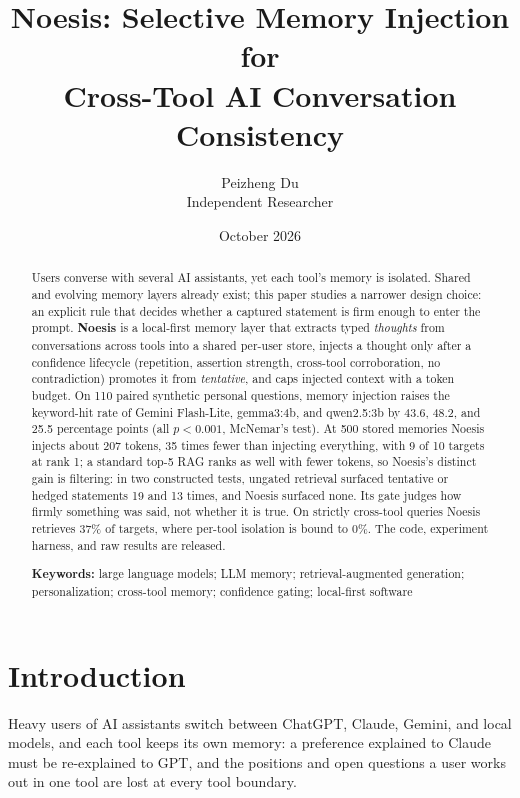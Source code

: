 \documentclass[11pt]{article}
\title{Noesis: Selective Memory Injection for\\Cross-Tool AI Conversation Consistency}
\author{Peizheng Du\\
  Independent Researcher}
\date{October 2026}
\begin{document}
\maketitle

\begin{abstract}
Users converse with several AI assistants, yet each tool's
memory is isolated. Shared and evolving memory layers already exist; this
paper studies a narrower design choice: an explicit rule that decides whether
a captured statement is firm enough to enter the prompt. \textbf{Noesis} is a
local-first memory layer that extracts typed \emph{thoughts} from
conversations across tools into a shared per-user store, injects a thought
only after a confidence lifecycle (repetition, assertion strength, cross-tool
corroboration, no contradiction) promotes it from \emph{tentative}, and caps
injected context with a token budget. On 110 paired synthetic personal
questions, memory injection raises the keyword-hit rate of Gemini Flash-Lite,
gemma3:4b, and qwen2.5:3b by 43.6, 48.2, and 25.5 percentage points (all
$p<0.001$, McNemar's test). At 500 stored memories Noesis injects about 207
tokens, 35 times fewer than injecting everything, with 9 of 10 targets at rank
1; a standard top-5 RAG ranks as well with fewer tokens, so Noesis's distinct
gain is filtering: in two constructed tests, ungated retrieval surfaced
tentative or hedged statements 19 and 13 times, and Noesis surfaced none. Its
gate judges how firmly something was said, not whether it is true. On strictly
cross-tool queries Noesis retrieves 37\% of targets, where per-tool isolation
is bound to 0\%. The code, experiment harness, and raw results are released.

\smallskip\noindent\textbf{Keywords:} large language models; LLM memory;
retrieval-augmented generation; personalization; cross-tool memory;
confidence gating; local-first software
\end{abstract}

\section{Introduction}
\label{sec:intro}

Heavy users of AI assistants switch between ChatGPT, Claude, Gemini, and local
models, and each tool keeps its own memory: a preference explained to Claude
must be re-explained to GPT, and the positions and open questions a user works
out in one tool are lost at every tool boundary.
\end{document}
